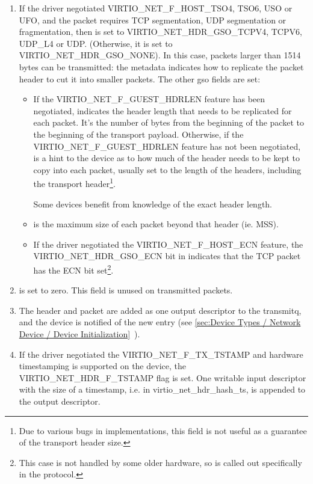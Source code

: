 \begin{enumerate}
\item If the driver negotiated
  VIRTIO_NET_F_HOST_TSO4, TSO6, USO or UFO, and the packet requires
  TCP segmentation, UDP segmentation or fragmentation, then 
  is set to VIRTIO_NET_HDR_GSO_TCPV4, TCPV6, UDP_L4 or UDP.
  (Otherwise, it is set to VIRTIO_NET_HDR_GSO_NONE). In this
  case, packets larger than 1514 bytes can be transmitted: the
  metadata indicates how to replicate the packet header to cut it
  into smaller packets. The other gso fields are set:

  \begin{itemize}
  \item If the VIRTIO_NET_F_GUEST_HDRLEN feature has been negotiated,
     indicates the header length that needs to be replicated
    for each packet. It's the number of bytes from the beginning of the packet
    to the beginning of the transport payload.
    Otherwise, if the VIRTIO_NET_F_GUEST_HDRLEN feature has not been negotiated,
     is a hint to the device as to how much of the header
    needs to be kept to copy into each packet, usually set to the
    length of the headers, including the transport header\footnote{Due to various bugs in implementations, this field is not useful
as a guarantee of the transport header size.
}.

  \begin{note}
  Some devices benefit from knowledge of the exact header length.
  \end{note}

  \item {} is the maximum size of each packet beyond that
    header (ie. MSS).

  \item If the driver negotiated the VIRTIO_NET_F_HOST_ECN feature,
    the VIRTIO_NET_HDR_GSO_ECN bit in 
    indicates that the TCP packet has the ECN bit set\footnote{This case is not handled by some older hardware, so is called out
specifically in the protocol.}.
   \end{itemize}

\item {} is set to zero.  This field is unused on transmitted packets.

\item The header and packet are added as one output descriptor to the
  transmitq, and the device is notified of the new entry
  (see \ref{sec:Device Types / Network Device / Device Initialization}~).

\item If the driver negotiated the VIRTIO_NET_F_TX_TSTAMP and hardware
  timestamping is supported on the device, the VIRTIO_NET_HDR_F_TSTAMP
  flag is set. One writable input descriptor with the size of a timestamp,
  i.e.  in virtio_net_hdr_hash_ts,
  is appended to the output descriptor.
\end{enumerate}

